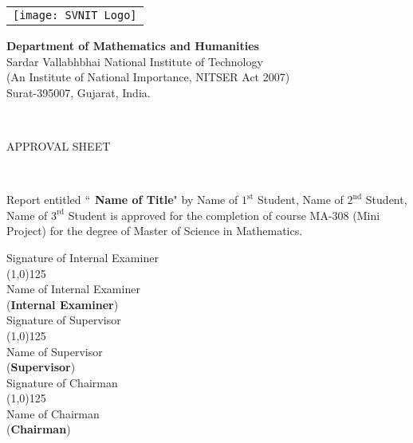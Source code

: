 \documentclass[11pt,a4paper]{report}
\begin{document}
\newpage
{}

\begin{minipage}{0.3\linewidth}
\begin{tabular}{r}
\texttt{[image: SVNIT Logo]}
\end{tabular}
\end{minipage}
\begin{minipage}{0.7\linewidth}
\begin{center}
\begin{large}
\textbf{Department of Mathematics and Humanities} \\
Sardar Vallabhbhai National Institute of Technology \\
(An Institute of National Importance, NITSER Act 2007) \\
Surat-395007, Gujarat, India.
\end{large}
\end{center}
\end{minipage}

\begin{center}
\hrulefill \\
\vspace*{-0.5cm}

\hrulefill
\end{center}

\vspace{1\baselineskip}
\begin{center}
{\color{blue} \begin{large}
APPROVAL SHEET
\end{large}} \\[2\baselineskip]
\end{center}

Report entitled $``$\textbf{{\color{red} Name of Title}}" by {\color{red} Name of $1^{\text{st}}$ Student}, {\color{red} Name of $2^{\text{nd}}$ Student}, {\color{red} Name of $3^{\text{rd}}$ Student} is approved for the completion of course MA-308 (Mini Project) for the degree of Master of Science in Mathematics. \\[2\baselineskip]

\begin{flushright}
{\color{red} Signature of Internal Examiner} \\
\line(1,0){125} \\
{\color{red} Name of Internal Examiner} \\
(\textbf{Internal Examiner}) \\[2\baselineskip]

{\color{red} Signature of Supervisor} \\
\line(1,0){125} \\
{\color{red} Name of Supervisor} \\
(\textbf{Supervisor}) \\[2\baselineskip]

{\color{red} Signature of Chairman} \\
\line(1,0){125} \\
{\color{red} Name of Chairman} \\
(\textbf{Chairman}) \\[2\baselineskip]
\end{flushright}
\end{document}
